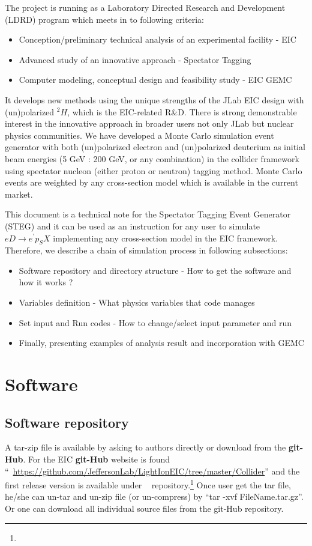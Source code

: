 \documentclass[12pt,letterpaper]{article}
\begin{document}
The project is running as a Laboratory Directed Research and Development (LDRD) program which meets in to following criteria:
\begin{itemize}
\item{} Conception/preliminary technical analysis of an experimental facility - EIC
\item{} Advanced study of an innovative approach - Spectator Tagging %
\item{} Computer modeling, conceptual design and feasibility study - EIC GEMC
\end{itemize}
  
 It develops new methods using the unique strengths of the JLab EIC design with (un)polarized ${}^2H$,
which is the EIC-related R\&D. There is strong demonstrable interest in
the innovative approach in broader users not only JLab but nuclear physics communities.
We have developed a Monte Carlo simulation event generator with both (un)polarized electron and  
(un)polarized deuterium as initial beam energies (5 GeV : 200 GeV, or any combination) in the  collider framework using spectator 
nucleon (either proton or neutron) tagging method.
Monte Carlo events are weighted by any cross-section model which is available in the current market.


This document is a technical note for the Spectator Tagging Event Generator (STEG) and it can be used as an instruction for any user to 
simulate $eD \to e^{\prime} p_S X$ implementing any cross-section model in the EIC framework.
Therefore, we describe a chain of simulation process in following subsections:
\begin{itemize}
\item{} Software repository and directory structure - How to get the software and how it works ?
\item{} Variables definition - What physics variables that code manages
\item{} Set input and Run codes - How to change/select input parameter and run
\item{} Finally, presenting examples of analysis result and incorporation with GEMC
\end{itemize}


\section{Software}
\subsection{Software repository}
A tar-zip file is available by asking to authors directly or download from the \textbf{git-Hub}.
For the EIC \textbf{git-Hub} website is found ``~\url{https://github.com/JeffersonLab/LightIonEIC/tree/master/Collider}'' and the first release version is available under ~\cite{gitHubLink} repository.\footnote{}
Once user get the tar file, he/she can un-tar and un-zip file (or un-compress) by ``tar -xvf FileName.tar.gz''. Or one can download all individual source files from the git-Hub repository.
\end{document}
